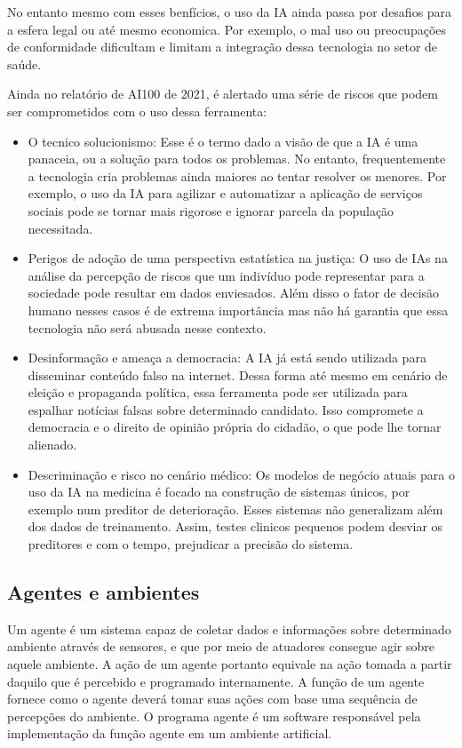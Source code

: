 \documentclass[a4paper,12pt]{article}
\begin{document}
No entanto mesmo com esses benfícios, o uso da IA ainda passa por desafios para a esfera legal ou até mesmo economica.  Por exemplo, o mal uso ou preocupações de conformidade dificultam e limitam a integração dessa tecnologia no setor de saúde.

Ainda no relatório de AI100 de 2021, é alertado uma série de riscos que podem ser comprometidos com o uso dessa ferramenta:

\begin{itemize}
    \item O tecnico solucionismo: Esse é o termo dado a visão de que a IA é uma panaceia, ou a solução para todos os problemas. No entanto, frequentemente a tecnologia cria problemas ainda maiores ao tentar resolver os menores. Por exemplo, o uso da IA para agilizar e automatizar a aplicação de serviços sociais pode se tornar mais rigorose e ignorar parcela da população necessitada.

    \item Perigos de adoção de uma perspectiva estatística na justiça: O uso de IAs na análise da percepção de riscos que um indivíduo pode representar para a sociedade pode resultar em dados enviesados. Além disso o fator de decisão humano nesses casos é de extrema importância mas não há garantia que essa tecnologia não será abusada nesse contexto.

    \item Desinformação e ameaça a democracia: A IA já está sendo utilizada para disseminar conteúdo falso na internet. Dessa forma até mesmo em cenário de eleição e propaganda política, essa ferramenta pode ser utilizada para espalhar notícias falsas sobre determinado candidato. Isso compromete a democracia e o direito de opinião própria do cidadão, o que pode lhe tornar alienado.

    \item Descriminação e risco no cenário médico: Os modelos de negócio atuais para o uso da IA na medicina é focado na construção de sistemas únicos, por exemplo num preditor de deterioração. Esses sistemas não generalizam além dos dados de treinamento. Assim, testes clinicos pequenos podem desviar os preditores e com o tempo, prejudicar a precisão do sistema.
    
\end{itemize}

\subsection{Agentes e ambientes}
Um agente é um sistema capaz de coletar dados e informações sobre determinado ambiente através de sensores, e que por meio de atuadores consegue agir sobre aquele ambiente. A ação de um agente portanto equivale na ação tomada a partir daquilo que é percebido e programado internamente. A função de um agente fornece como o agente deverá tomar suas ações com base uma sequência de percepções do ambiente. O programa agente é um software responsável pela implementação da função agente em um ambiente artificial.
\end{document}
